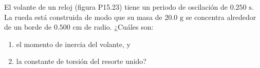 \item El volante de un reloj (figura P15.23) tiene un periodo de oscilación de $0.250\text{ s}$. La rueda está construida de modo que su masa de $20.0\text{ g}$ se concentra alrededor de un borde de $0.500\text{ cm}$ de radio. ¿Cuáles son:
\begin{enumerate}
    \item el momento de inercia del volante, y
    \item la constante de torsión del resorte unido?
\end{enumerate}